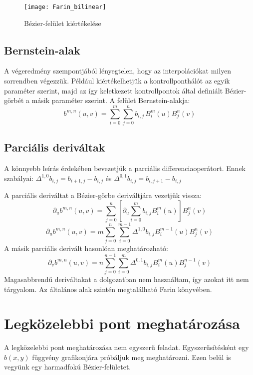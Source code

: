 \begin{figure}[H]
	\centering
	\texttt{[image: Farin\_bilinear]}
	\caption{Bézier-felület kiértékelése \cite[248. o.]{farin2002curves}}
\end{figure}

\subsection{Bernstein-alak}
A végeredmény szempontjából lényegtelen, hogy az interpolációkat milyen sorrendben végezzük. Például kiértékelhetjük a kontrollponthálót az egyik paraméter szerint, majd az így keletkezett kontrollpontok által definiált Bézier-görbét a másik paraméter szerint. \cite[251. o.]{farin2002curves} A felület Bernstein-alakja:
$$ b^{m,n}(u,v) = \sum_{i=0}^m \sum_{j=0}^n b_{i,j}\, B^m_i(u) B^n_j(v) $$

\subsection{Parciális deriváltak}
A könnyebb leírás érdekében bevezetjük a parciális differenciaoperátort. Ennek szabályai: $\Delta^{1,0}b_{i,j} = b_{i+1,j} - b_{i,j}$ és  $\Delta^{0,1}b_{i,j} = b_{i,j+1} - b_{i,j}$

A parciális deriváltat a Bézier-görbe deriváltjára vezetjük vissza:
$$ \partial_u b^{m,n}(u,v) = \sum_{j=0}^n \left[\partial_u \sum_{i=0}^m b_{i,j} B^m_i(u) \right] B^n_j(v) $$
$$ \partial_u b^{m,n}(u,v) = m\sum_{j=0}^n \sum_{i=0}^{m-1} \Delta^{1,0} b_{i,j} B^{m-1}_i(u)  B^n_j(v) $$
A másik parciális derivált hasonlóan meghatározható:
$$ \partial_v b^{m,n}(u,v) = n\sum_{j=0}^{n-1} \sum_{i=0}^m \Delta^{0,1} b_{i,j} B^m_i(u)  B^{n-1}_j(v) $$
Magasabbrendű deriváltakat a dolgozatban nem használtam, így azokat itt nem tárgyalom. Az általános alak szintén megtalálható Farin könyvében.



\section{Legközelebbi pont meghatározása}

A legközelebbi pont meghatározása nem egyszerű feladat. Egyszerűsítésként egy $b(x,y)$ függvény grafikonjára próbáljuk meg meghatározni. Ezen belül is vegyünk egy harmadfokú Bézier-felületet.

